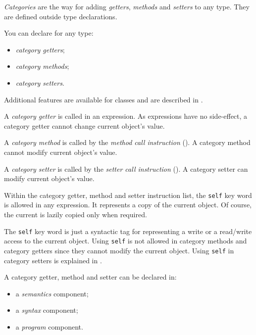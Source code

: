 

\emph{Categories} are the way for adding \emph{getters}, \emph{methods} and \emph{setters} to any type. They are defined outside type declarations.

You can declare for any type:
\begin{itemize}
\item \emph{category getters};
\item \emph{category methods};
\item \emph{category setters}.
\end{itemize}

Additional features are available for classes and are described in .


A \emph{category getter} is called in an expression. As expressions have no side-effect, a category getter cannot change current object's value.

A \emph{category method} is called by the \emph{method call instruction} (). A category method cannot modify current object's value.

A \emph{category setter} is called by the \emph{setter call instruction} (). A category setter can modify current object's value.

Within the category getter, method and setter instruction list, the \lstinline[language=galgas]!self! key word is allowed in any expression. It represents a copy of the current object. Of course, the current is lazily copied only when required.

The \lstinline[language=galgas]!self! key word is just a syntactic tag for representing a write or a read/write access to the current object. Using \lstinline[language=galgas]!self! is not allowed in category methods and category getters since they cannot modify the current object. Using \lstinline[language=galgas]!self! in category setters is explained in . 


A category getter, method and setter can be declared in:
\begin{itemize}
\item a \emph{semantics} component;
\item a \emph{syntax} component;
\item a \emph{program} component.
\end{itemize}

